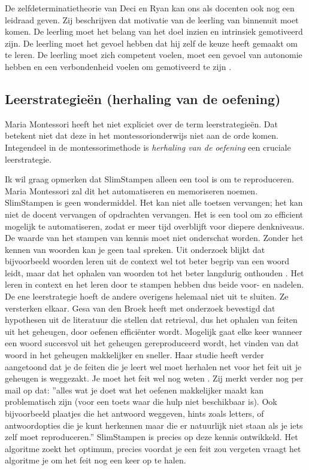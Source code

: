 \documentclass[12pt, a4paper]{article}
\begin{document}
De zelfdeterminatietheorie van Deci en Ryan kan ons als docenten ook nog een leidraad geven. Zij beschrijven dat motivatie van de leerling van binnenuit moet komen. De leerling moet het belang van het doel inzien en intrinsiek gemotiveerd zijn. De leerling moet het gevoel hebben dat hij zelf de keuze heeft gemaakt om te leren. De leerling moet zich competent voelen, moet een gevoel van autonomie hebben en een verbondenheid voelen om gemotiveerd te zijn \cite[p.436-439]{woolfolk}.

\subsection{Leerstrategieën (herhaling van de oefening)}
Maria Montessori heeft het niet expliciet over de term leerstrategieën. Dat betekent niet dat deze in het montessorionderwijs niet aan de orde komen. Integendeel in de montessorimethode is \emph{herhaling van de oefening} een cruciale leerstrategie. 

Ik wil graag opmerken dat SlimStampen alleen een tool is om te reproduceren. Maria Montessori zal dit het automatiseren en memoriseren noemen. SlimStampen is geen wondermiddel. Het kan niet alle toetsen vervangen; het kan niet de docent vervangen of opdrachten vervangen. Het is een tool om zo efficient mogelijk te automatiseren, zodat er meer tijd overblijft voor diepere denkniveaus. De waarde van het stampen van kennis moet niet onderschat worden. Zonder het kennen van woorden kan je geen taal spreken. Uit onderzoek blijkt dat bijvoorbeeld woorden leren uit de context wel tot beter begrip van een woord leidt, maar dat het ophalen van woorden tot het beter langdurig onthouden \cite[]{gesa}. Het leren in context en het leren door te stampen hebben dus beide voor- en nadelen. De ene leerstrategie hoeft de andere overigens helemaal niet uit te sluiten. Ze versterken elkaar. Gesa van den Broek heeft met onderzoek bevestigd dat hypothesen uit de literatuur die stellen dat retrieval, dus het ophalen van feiten uit het geheugen, door oefenen efficiënter wordt. Mogelijk gaat elke keer wanneer een woord succesvol uit het geheugen gereproduceerd wordt, het vinden van dat woord in het geheugen makkelijker en sneller. Haar studie heeft verder aangetoond dat je de feiten die je leert wel moet herhalen net voor het feit uit je geheugen is weggezakt. Je moet het feit wel nog weten \cite[]{gesa2}. Zij merkt verder nog per mail op dat: ''alles wat je doet wat het oefenen makkelijker maakt kan problematisch zijn (voor een toets waar die hulp niet beschikbaar is). Ook bijvoorbeeld plaatjes die het antwoord weggeven, hints zoals letters, of antwoordopties die je kunt herkennen maar die er natuurlijk niet staan als je iets zelf moet reproduceren.'' SlimStampen is precies op deze kennis ontwikkeld. Het algoritme zoekt het optimum, precies voordat je een feit zou vergeten vraagt het algoritme je om het feit nog een keer op te halen.
\end{document}
